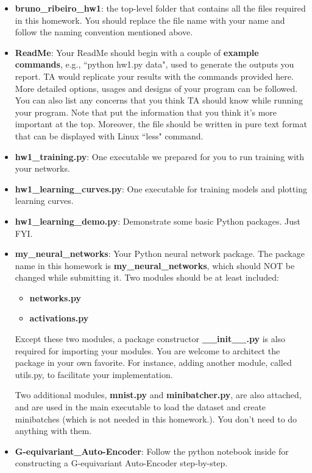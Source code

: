 \documentclass{article}
\newcommand{\homeworknumber}{1}
\begin{document}
\hfill

\begin{itemize}
\item \textbf{bruno\_ribeiro\_hw\homeworknumber}: the top-level folder that contains all the files
          required in this homework. You should replace the file name with your
          name and follow the naming convention mentioned above.

\item \textbf{ReadMe}: Your ReadMe should begin with a couple of \textbf{example commands}, e.g., ``python hw\homeworknumber.py data", used to generate the outputs you report. TA would replicate your results with the commands
          provided here. More detailed options, usages and designs of your
          program can be followed. You can also list any concerns that you
          think TA should know while running your program. Note that put the
          information that you think it's more important at the top. Moreover,
          the file should be written in pure text format that can be displayed
          with Linux ``less" command.

\item \textbf{hw\homeworknumber\_training.py}: One executable we prepared for you to run
          training with your networks.

\item \textbf{hw\homeworknumber\_learning\_curves.py}: One executable for training models
          and plotting learning curves.

\item \textbf{hw\homeworknumber\_learning\_demo.py}: Demonstrate some basic Python packages. Just FYI.

\item \textbf{my\_neural\_networks}: Your Python neural network package.
          The package name in this homework is \textbf{my\_neural\_networks},
          which should NOT be changed while submitting it. Two modules should
          be at least included:
\begin{itemize}
\item \textbf{networks.py}
\item \textbf{activations.py}
\end{itemize}
Except these two modules, a package constructor \textbf{\_\_init\_\_.py} is also required for importing your modules. You are welcome to architect the package in your own favorite. For instance, adding another module, called utils.py, to facilitate your implementation.

Two additional modules, \textbf{mnist.py} and \textbf{minibatcher.py}, are also attached, and are used in the main executable to load the dataset and create minibatches (which is not needed in this homework.). You don't need to do anything with them.

\item \textbf{G-equivariant\_Auto-Encoder}: Follow the python notebook inside for constructing a G-equivariant Auto-Encoder step-by-step.

\end{itemize}
\end{document}
